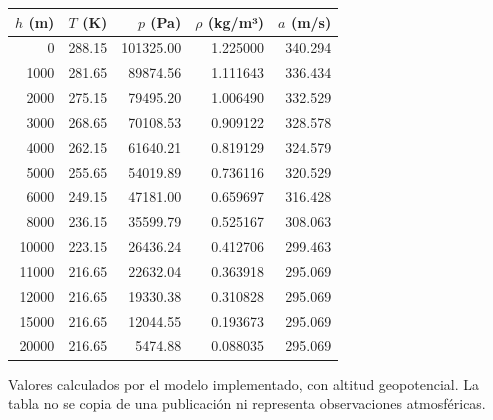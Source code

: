 \begin{center}\begin{tabular}{rrrrr}\toprule $h$ (m)&$T$ (K)&$p$ (Pa)&$\rho$ (kg/m³)&$a$ (m/s)\\\midrule
0&288.15&101325.00&1.225000&340.294\\
1000&281.65&89874.56&1.111643&336.434\\
2000&275.15&79495.20&1.006490&332.529\\
3000&268.65&70108.53&0.909122&328.578\\
4000&262.15&61640.21&0.819129&324.579\\
5000&255.65&54019.89&0.736116&320.529\\
6000&249.15&47181.00&0.659697&316.428\\
8000&236.15&35599.79&0.525167&308.063\\
10000&223.15&26436.24&0.412706&299.463\\
11000&216.65&22632.04&0.363918&295.069\\
12000&216.65&19330.38&0.310828&295.069\\
15000&216.65&12044.55&0.193673&295.069\\
20000&216.65&5474.88&0.088035&295.069\\
\bottomrule\end{tabular}\end{center}
Valores calculados por el modelo implementado, con altitud geopotencial. La tabla no se copia de una publicación ni representa observaciones atmosféricas.